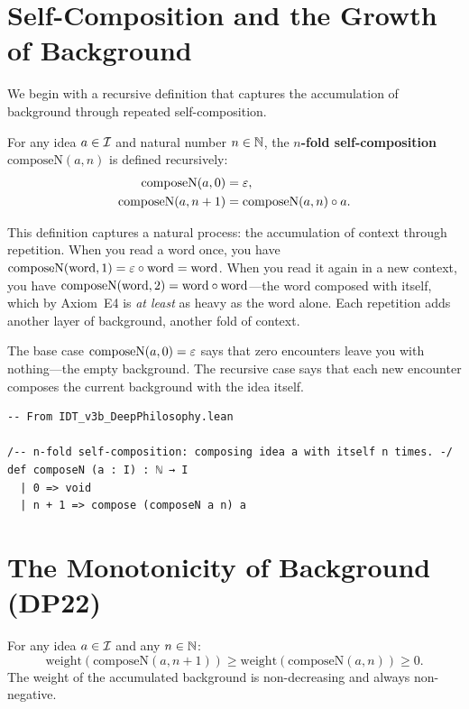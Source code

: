 \section{Self-Composition and the Growth of Background}

We begin with a recursive definition that captures the accumulation
of background through repeated self-composition.

\begin{definition}
\label{def:composeN}
For any idea $a \in \mathcal{I}$ and natural number $n \in \mathbb{N}$, the
\textbf{$n$-fold self-composition} $\mathrm{composeN}(a, n)$ is defined
recursively:
\begin{align}
\mathrm{composeN}(a, 0) &= \varepsilon, \\
\mathrm{composeN}(a, n+1) &= \mathrm{composeN}(a, n) \circ a.
\end{align}
\end{definition}

This definition captures a natural process: the accumulation of
context through repetition.  When you read a word once, you have
$\mathrm{composeN}(\text{word}, 1) = \varepsilon \circ \text{word} = \text{word}$.
When you read it again in a new context, you have $\mathrm{composeN}(\text{word}, 2)
= \text{word} \circ \text{word}$---the word composed with itself, which by
Axiom~E4 is \emph{at least} as heavy as the word alone.  Each repetition
adds another layer of background, another fold of context.

The base case $\mathrm{composeN}(a, 0) = \varepsilon$ says that zero encounters
leave you with nothing---the empty background.  The recursive case says
that each new encounter composes the current background with the idea
itself.

\begin{lstlisting}
-- From IDT_v3b_DeepPhilosophy.lean

/-- n-fold self-composition: composing idea a with itself n times. -/
def composeN (a : I) : ℕ → I
  | 0 => void
  | n + 1 => compose (composeN a n) a
\end{lstlisting}

\section{The Monotonicity of Background (DP22)}

\begin{theorem}
\label{thm:background-weight-monotone}
For any idea $a \in \mathcal{I}$ and any $n \in \mathbb{N}$:
\[
\mathrm{weight}(\mathrm{composeN}(a, n+1)) \geq
\mathrm{weight}(\mathrm{composeN}(a, n)) \geq 0.
\]
The weight of the accumulated background is non-decreasing and always
non-negative.
\end{theorem}

